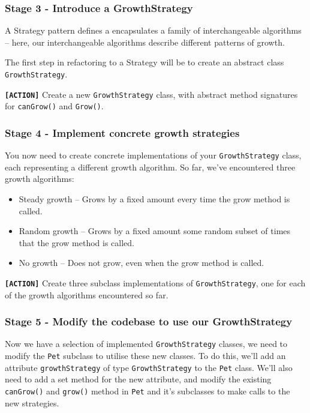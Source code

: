 \documentclass[
]{book}
\providecommand{\tightlist}{%
  \setlength{\itemsep}{0pt}\setlength{\parskip}{0pt}}
\begin{document}
\hypertarget{growthstrategy}{%
\subsubsection{Stage 3 - Introduce a GrowthStrategy}\label{growthstrategy}}

A Strategy pattern defines a encapsulates a family of interchangeable algorithms -- here, our interchangeable algorithms describe different patterns of growth.

The first step in refactoring to a Strategy will be to create an abstract class \texttt{GrowthStrategy}.

\textbf{\texttt{{[}ACTION{]}}} \color{black} Create a new \texttt{GrowthStrategy} class, with abstract method signatures for \texttt{canGrow()} and \texttt{Grow()}.

\hypertarget{growthstrategies}{%
\subsubsection{Stage 4 - Implement concrete growth strategies}\label{growthstrategies}}

You now need to create concrete implementations of your \texttt{GrowthStrategy} class, each representing a different growth algorithm. So far, we've encountered three growth algorithms:

\begin{itemize}
\tightlist
\item
  Steady growth -- Grows by a fixed amount every time the grow method is called.
\item
  Random growth -- Grows by a fixed amount some random subset of times that the grow method is called.
\item
  No growth -- Does not grow, even when the grow method is called.
\end{itemize}

\textbf{\texttt{{[}ACTION{]}}} Create three subclass implementations of \texttt{GrowthStrategy}, one for each of the growth algorithms encountered so far.

\hypertarget{modifys}{%
\subsubsection{Stage 5 - Modify the codebase to use our GrowthStrategy}\label{modifys}}

Now we have a selection of implemented \texttt{GrowthStrategy} classes, we need to modify the \texttt{Pet} subclass to utilise these new classes. To do this, we'll add an attribute \texttt{growthStrategy} of type \texttt{GrowthStrategy} to the \texttt{Pet} class. We'll also need to add a set method for the new attribute, and modify the existing \texttt{canGrow()} and \texttt{grow()} method in \texttt{Pet} and it's subclasses to make calls to the new strategies.
\end{document}
